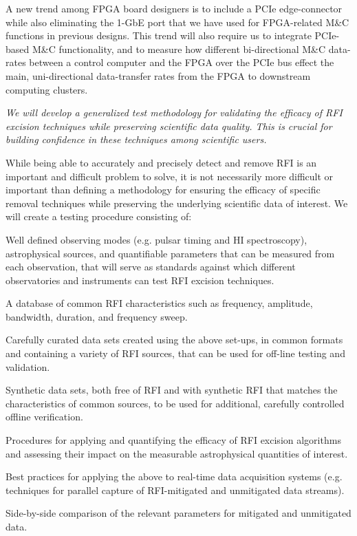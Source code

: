\documentclass[10pt]{myNSF}
\begin{document}
A new trend among FPGA board designers is to include a PCIe
edge-connector while also eliminating the 1-GbE port that we have used
for FPGA-related M\&C functions in previous designs. This trend will
also require us to integrate PCIe-based M\&C functionality, and to
measure how different bi-directional M\&C data-rates between a control
computer and the FPGA over the PCIe bus effect the main,
uni-directional data-transfer rates from the FPGA to downstream
computing clusters.

\label{sec:rfi_procedures}

\emph{We will develop a generalized test methodology for validating
  the efficacy of RFI excision techniques while preserving scientific
  data quality.  This is crucial for building confidence in these
  techniques among scientific users.}

While being able to accurately and precisely detect and remove RFI is
an important and difficult problem to solve, it is not necessarily
more difficult or important than defining a methodology for ensuring
the efficacy of specific removal techniques while preserving the
underlying scientific data of interest.  We will create a testing
procedure consisting of:
\begin{itemize*}
\item{Well defined observing modes (e.g. pulsar timing and H{\sc I}
  spectroscopy), astrophysical sources, and quantifiable parameters
  that can be measured from each observation, that will serve as
  standards against which different observatories and instruments can
  test RFI excision techniques.}
\item{A database of common RFI characteristics such as frequency,
  amplitude, bandwidth, duration, and frequency sweep.}
\item{Carefully curated data sets created using the above set-ups, in
  common formats and containing a variety of RFI sources, that can be
  used for off-line testing and validation.}
\item{Synthetic data sets, both free of RFI and with synthetic RFI that
    matches the characteristics of common sources, to be used for
    additional, carefully controlled offline verification.}
\item{Procedures for applying and quantifying the efficacy of RFI
  excision algorithms and assessing their impact on the measurable
  astrophysical quantities of interest.}
\item{Best practices for applying the above to real-time data
  acquisition systems (e.g. techniques for parallel capture of
  RFI-mitigated and unmitigated data streams).}
\item{Side-by-side comparison of the relevant parameters for mitigated
  and unmitigated data.}
\end{itemize*}
\end{document}
